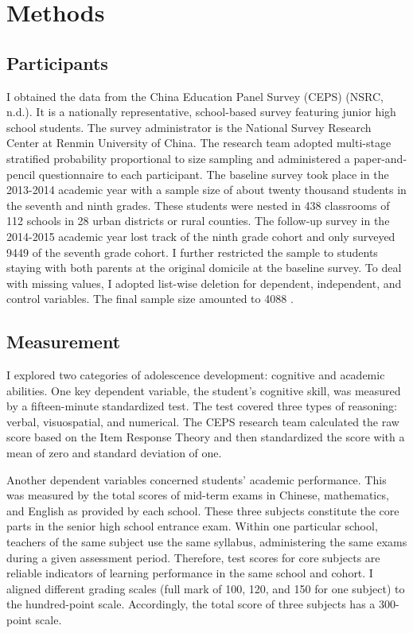 \documentclass[
  man,floatsintext]{apa7}
\begin{document}
\newpage

\hypertarget{methods}{%
\section{Methods}\label{methods}}

\hypertarget{participants}{%
\subsection{Participants}\label{participants}}

I obtained the data from the China Education Panel Survey (CEPS) (NSRC, n.d.). It is a nationally representative, school-based survey featuring junior high school students. The survey administrator is the National Survey Research Center at Renmin University of China. The research team adopted multi-stage stratified probability proportional to size sampling and administered a paper-and-pencil questionnaire to each participant. The baseline survey took place in the 2013-2014 academic year with a sample size of about twenty thousand students in the seventh and ninth grades. These students were nested in 438 classrooms of 112 schools in 28 urban districts or rural counties. The follow-up survey in the 2014-2015 academic year lost track of the ninth grade cohort and only surveyed 9449 of the seventh grade cohort. I further restricted the sample to students staying with both parents at the original domicile at the baseline survey. To deal with missing values, I adopted list-wise deletion for dependent, independent, and control variables. The final sample size amounted to 4088 .

\hypertarget{measurement}{%
\subsection{Measurement}\label{measurement}}

I explored two categories of adolescence development: cognitive and academic abilities. One key dependent variable, the student's cognitive skill, was measured by a fifteen-minute standardized test. The test covered three types of reasoning: verbal, visuospatial, and numerical. The CEPS research team calculated the raw score based on the Item Response Theory and then standardized the score with a mean of zero and standard deviation of one.

Another dependent variables concerned students' academic performance. This was measured by the total scores of mid-term exams in Chinese, mathematics, and English as provided by each school. These three subjects constitute the core parts in the senior high school entrance exam. Within one particular school, teachers of the same subject use the same syllabus, administering the same exams during a given assessment period. Therefore, test scores for core subjects are reliable indicators of learning performance in the same school and cohort. I aligned different grading scales (full mark of 100, 120, and 150 for one subject) to the hundred-point scale. Accordingly, the total score of three subjects has a 300-point scale.
\end{document}

